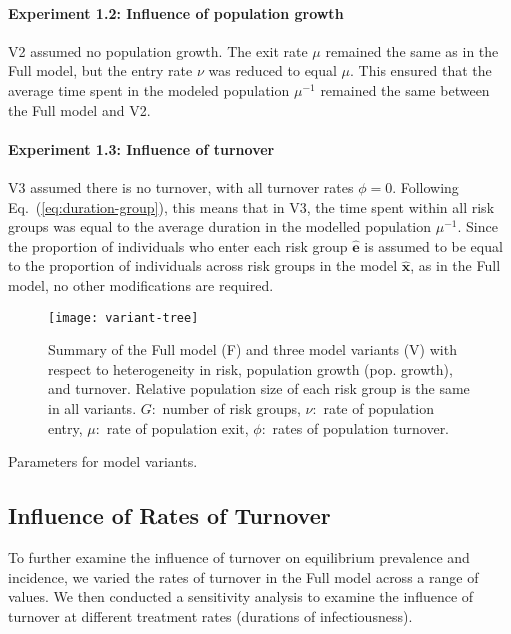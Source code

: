\paragraph{Experiment 1.2: Influence of population growth}
\label{p:exp-1-growth}
V2 assumed no population growth.
The exit rate $\mu$ remained the same as in the Full model,
but the entry rate $\nu$ was reduced to equal $\mu$.
This ensured that the average time spent in the modeled population $\mu^{-1}$
remained the same between the Full model and V2.
\paragraph{Experiment 1.3: Influence of turnover}
\label{p:exp-1-turnover}
V3 assumed there is no turnover, with all turnover rates $\phi = 0$.
Following Eq.~(\ref{eq:duration-group}),
this means that in V3, the time spent within all risk groups was equal to
the average duration in the modelled population $\mu^{-1}$.
Since the proportion of individuals who enter each risk group $\bm{\hat{e}}$
is assumed to be equal to
the proportion of individuals across risk groups in the model $\bm{\hat{x}}$,
as in the Full model,
no other modifications are required.
\begin{figure}
  \centering
  \texttt{[image: variant-tree]}
  \caption{Summary of the Full model (F) and three model variants (V)
    with respect to heterogeneity in risk, population growth (pop. growth), and turnover.
    Relative population size of each risk group is the same in all variants.
    $G$:~number of risk groups,
    $\nu$:~rate of population entry,
    $\mu$:~rate of population exit,
    $\phi$:~rates of population turnover.}
  \label{fig:variant-tree}
\end{figure}
\begin{table}
  \centering
  \caption{Parameters for model variants.}
  \label{tab:params-variants}
  
\end{table}
\subsection{Influence of Rates of Turnover}\label{ss:exp-turnover}
To further examine the influence of turnover on
equilibrium prevalence and incidence,
we varied the rates of turnover in the Full model across a range of values.
We then conducted a sensitivity analysis
to examine the influence of turnover
at different treatment rates (durations of infectiousness).
